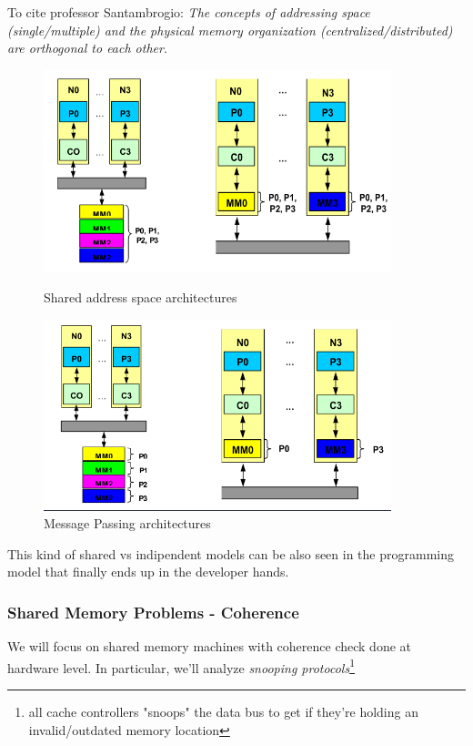 \documentclass[10pt,a4paper]{article}
\begin{document}
					To cite professor Santambrogio: \emph{The concepts of addressing space (single/multiple) and the physical memory organization (centralized/distributed) are orthogonal to each other}.
					\begin{figure}[H]
						\centering
						\begin{minipage}{0.45\textwidth}
							\centering
							\includegraphics[width=0.9\textwidth]{./images/sharedMemory.png}
							\caption{Shared address space architectures}
						\end{minipage}\hfill
						\begin{minipage}{0.45\textwidth}
							\centering
							\includegraphics[width=0.9\textwidth]{./images/messagePassing.png}
							\caption{Message Passing architectures}
						\end{minipage}
					\end{figure}
					This kind of shared vs indipendent models can be also seen in the programming model that finally ends up in the developer hands.
					
				\subsubsection{Shared Memory Problems - Coherence}
					We will focus on shared memory machines with coherence check done at hardware level. In particular, we'll analyze \emph{snooping protocols}\footnote{all cache controllers "snoops" the data bus to get if they're holding an invalid/outdated memory location} 
					
\end{document}
